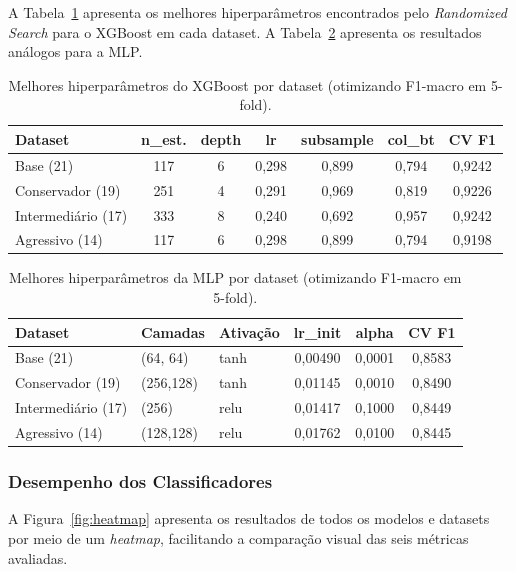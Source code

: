 \documentclass[12pt, a4paper]{article}
\begin{document}
A Tabela~\ref{tab:best_params_xgb} apresenta os melhores hiperparâmetros encontrados pelo
\textit{Randomized Search} para o XGBoost em cada dataset. A Tabela~\ref{tab:best_params_mlp}
apresenta os resultados análogos para a MLP.

\begin{table}[H]
\centering
\caption{Melhores hiperparâmetros do XGBoost por dataset (otimizando F1-macro em 5-fold).}
\label{tab:best_params_xgb}
\small
\begin{tabular}{lcccccc}
\toprule
\textbf{Dataset} & \textbf{n\_est.} & \textbf{depth} & \textbf{lr} & \textbf{subsample} & \textbf{col\_bt} & \textbf{CV F1} \\
\midrule
Base (21)         & 117 & 6 & 0,298 & 0,899 & 0,794 & 0,9242 \\
Conservador (19)  & 251 & 4 & 0,291 & 0,969 & 0,819 & 0,9226 \\
Intermediário (17)& 333 & 8 & 0,240 & 0,692 & 0,957 & 0,9242 \\
Agressivo (14)    & 117 & 6 & 0,298 & 0,899 & 0,794 & 0,9198 \\
\bottomrule
\end{tabular}
\end{table}

\begin{table}[H]
\centering
\caption{Melhores hiperparâmetros da MLP por dataset (otimizando F1-macro em 5-fold).}
\label{tab:best_params_mlp}
\small
\begin{tabular}{lllccc}
\toprule
\textbf{Dataset} & \textbf{Camadas} & \textbf{Ativação} & \textbf{lr\_init} & \textbf{alpha} & \textbf{CV F1} \\
\midrule
Base (21)          & (64, 64)  & tanh & 0,00490 & 0,0001 & 0,8583 \\
Conservador (19)   & (256,128) & tanh & 0,01145 & 0,0010 & 0,8490 \\
Intermediário (17) & (256)     & relu & 0,01417 & 0,1000 & 0,8449 \\
Agressivo (14)     & (128,128) & relu & 0,01762 & 0,0100 & 0,8445 \\
\bottomrule
\end{tabular}
\end{table}

\subsubsection{Desempenho dos Classificadores}

A Figura~\ref{fig:heatmap} apresenta os resultados de todos os modelos e datasets por meio de
um \textit{heatmap}, facilitando a comparação visual das seis métricas avaliadas.
\end{document}

